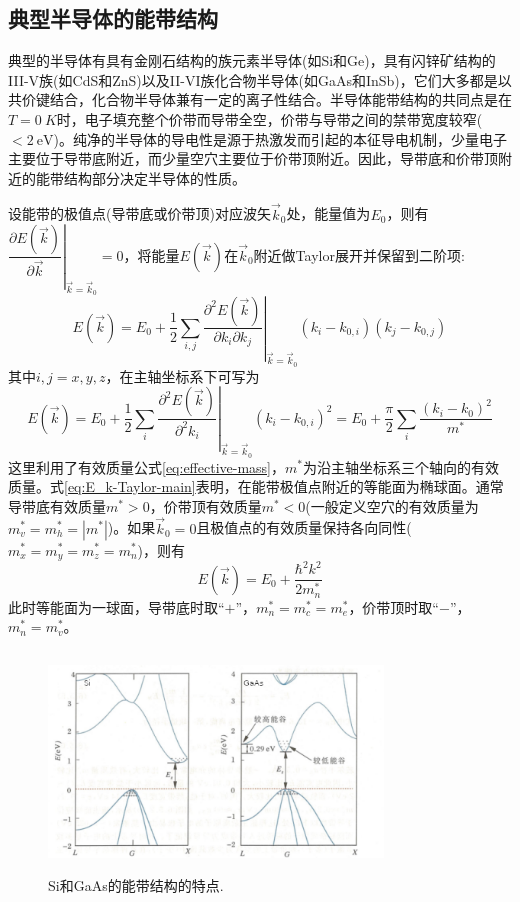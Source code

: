\subsection{典型半导体的能带结构}\label{Classic_Semi-conductor}
典型的半导体有具有金刚石结构的族元素半导体(如Si和Ge)，具有闪锌矿结构的III-V族(如CdS和ZnS)以及II-VI族化合物半导体(如GaAs和InSb)，它们大多都是以共价键结合，化合物半导体兼有一定的离子性结合。半导体能带结构的共同点是在$T=0~K$时，电子填充整个价带而导带全空，价带与导带之间的禁带宽度较窄($<\!2~\mathrm{eV}$)。纯净的半导体的导电性是源于热激发而引起的本征导电机制，少量电子主要位于导带底附近，而少量空穴主要位于价带顶附近。因此，导带底和价带顶附近的能带结构部分决定半导体的性质。

设能带的极值点(导带底或价带顶)对应波矢$\vec k_0$处，能量值为$E_0$，则有$\left.\dfrac{\partial E(\vec k)}{\partial\vec k}\right|_{\vec k=\vec k_0}=0$，将能量$E(\vec k)$在$\vec k_0$附近做Taylor展开并保留到二阶项:
\begin{equation}
	E(\vec k)=E_0+\dfrac12\sum_{i,j}\left.\dfrac{\partial^2E(\vec k)}{\partial k_i\partial k_j}\right|_{\vec k=\vec k_0}(k_i-k_{0,i})(k_j-k_{0,j})
	\label{eq:E_k-Taylor}
\end{equation}
其中$i, j=x, y, z$，在主轴坐标系下可写为
\begin{equation}
	E(\vec k)=E_0+\dfrac12\sum_{i}\left.\dfrac{\partial^2E(\vec k)}{\partial^2 k_i}\right|_{\vec k=\vec k_0}(k_i-k_{0,i})^2=E_0+\dfrac{\pi}2\sum_i\dfrac{(k_i-k_0)^2}{m^{\ast}}
	\label{eq:E_k-Taylor-main}
\end{equation}
这里利用了有效质量公式\eqref{eq:effective-mass}，$m^{\ast}$为沿主轴坐标系三个轴向的有效质量。式\eqref{eq:E_k-Taylor-main}表明，在能带极值点附近的等能面为椭球面。通常导带底有效质量$m^{\ast}>0$，价带顶有效质量$m^{\ast}<0$(一般定义空穴的有效质量为$m_v^{\ast}=m_h^{\ast}=|m^{\ast}|$)。如果$\vec k_0=0$且极值点的有效质量保持各向同性($m_x^{\ast}=m_y^{\ast}=m_z^{\ast}=m_n^{\ast}$)，则有
\begin{equation}
	E(\vec k)=E_0+\dfrac{\hbar^2k^2}{2m_n^{\ast}}
	\label{eq:E_Taylor-isotropic}
\end{equation}
此时等能面为一球面，导带底时取``$+$''，$m_n^{\ast}=m_c^{\ast}=m_e^{\ast}$，价带顶时取``$-$''，$m_n^{\ast}=m_v^{\ast}$。
\begin{figure}[h!]
\centering
\vspace*{-0.10in}
\includegraphics[height=2.30in,width=3.50in,viewport=0 0 100 60,clip]{Figures/Band_Structure-Si-GaAs.png}
\caption{\small \textrm{Si和GaAs的能带结构的特点.}}%
\label{Fig:Band_Structure-Si-GaAs}
\end{figure}

